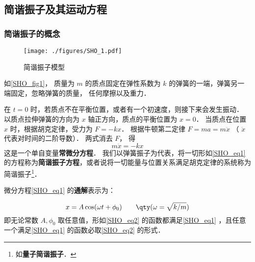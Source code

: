 


\subsection{简谐振子及其运动方程}

\subsubsection{简谐振子的概念}

\begin{figure}[ht]
\centering
\texttt{[image: ./figures/SHO\_1.pdf]}
\caption{简谐振子模型} \label{SHO_fig1}
\end{figure}

如\autoref{SHO_fig1}， 质量为 $m$ 的质点固定在弹性系数为 $k$ 的弹簧的一端，弹簧另一端固定，忽略弹簧的质量， 任何摩擦以及重力．

在 $t = 0$ 时，若质点不在平衡位置，或者有一个初速度，则接下来会发生振动． 以质点拉伸弹簧的方向为 $x$ 轴正方向，质点的平衡位置为 $x = 0$． 当质点在位置 $x$ 时，根据胡克定律，受力为 $F =  - kx$． 根据牛顿第二定律 $F = ma = m\ddot x$ （ $\ddot x$ 代表对时间的二阶导数）．  两式消去 $F$， 得
\begin{equation}\label{SHO_eq1}
m\ddot x =  - kx
\end{equation}
这是一个单自变量\textbf{常微分方程}． 我们以弹簧振子为代表，将一切形如\autoref{SHO_eq1} 的方程称为\textbf{简谐振子方程}，或者说将一切能量与位置关系满足胡克定律的系统称为简谐振子\footnote{如\textbf{量子简谐振子}．}．




微分方程\autoref{SHO_eq1} 的\textbf{通解}表示为：

\begin{equation}\label{SHO_eq2}
x = A\cos(\omega t + \phi_0)  \qquad \qty(\omega  = \sqrt{k/m})
\end{equation}
即无论常数 $A, \phi_0$ 取任意值，形如\autoref{SHO_eq2} 的函数都满足\autoref{SHO_eq1} ，且任意一个满足\autoref{SHO_eq1} 的函数必取\autoref{SHO_eq2} 的形式．


